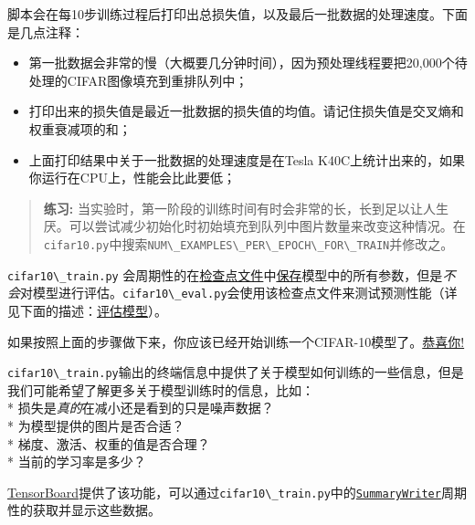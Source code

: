 脚本会在每10步训练过程后打印出总损失值，以及最后一批数据的处理速度。下面是几点注释：

\begin{itemize}
\item
  第一批数据会非常的慢（大概要几分钟时间），因为预处理线程要把20,000个待处理的CIFAR图像填充到重排队列中；
\item
  打印出来的损失值是最近一批数据的损失值的均值。请记住损失值是交叉熵和权重衰减项的和；
\item
  上面打印结果中关于一批数据的处理速度是在Tesla
  K40C上统计出来的，如果你运行在CPU上，性能会比此要低；
\end{itemize}

\begin{quote}
\textbf{练习:}
当实验时，第一阶段的训练时间有时会非常的长，长到足以让人生厌。可以尝试减少初始化时初始填充到队列中图片数量来改变这种情况。在\lstinline{cifar10.py}中搜索\lstinline{NUM\_EXAMPLES\_PER\_EPOCH\_FOR\_TRAIN}并修改之。
\end{quote}

\lstinline{cifar10\_train.py}
会周期性的在\href{https://github.com/jikexueyuanwiki/tensorflow-zh/tree/master/SOURCE/how_tos/variables/index.md\#saving-and-restoring}{检查点文件}中\href{https://github.com/jikexueyuanwiki/tensorflow-zh/blob/master/SOURCE/api_docs/python/state_ops.md\#Saver}{保存}模型中的所有参数，但是\emph{不会}对模型进行评估。\lstinline{cifar10\_eval.py}会使用该检查点文件来测试预测性能（详见下面的描述：\protect\hyperlink{ux8bc4ux4f30ux6a21ux578b}{评估模型}）。

如果按照上面的步骤做下来，你应该已经开始训练一个CIFAR-10模型了。\href{https://www.youtube.com/watch?v=9bZkp7q19f0}{恭喜你!}

\lstinline{cifar10\_train.py}输出的终端信息中提供了关于模型如何训练的一些信息，但是我们可能希望了解更多关于模型训练时的信息，比如：\\
* 损失是\emph{真的}在减小还是看到的只是噪声数据？\\
* 为模型提供的图片是否合适？\\
* 梯度、激活、权重的值是否合理？\\
* 当前的学习率是多少？

\href{https://github.com/jikexueyuanwiki/tensorflow-zh/tree/master/SOURCE/how_tos/summaries_and_tensorboard/index.md}{TensorBoard}提供了该功能，可以通过\lstinline{cifar10\_train.py}中的\href{https://github.com/jikexueyuanwiki/tensorflow-zh/blob/master/SOURCE/api_docs/python/train.md\#SummaryWriter}{\lstinline{SummaryWriter}}周期性的获取并显示这些数据。

